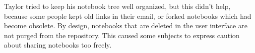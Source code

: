 Taylor tried to keep his notebook tree well organized, but this didn't help,
because some people kept old links in their email, or forked notebooks which 
had become obsolete. By design, notebooks that are deleted in the user interface
are not purged from the repository. This caused some subjects to express
caution about sharing notebooks too freely.


